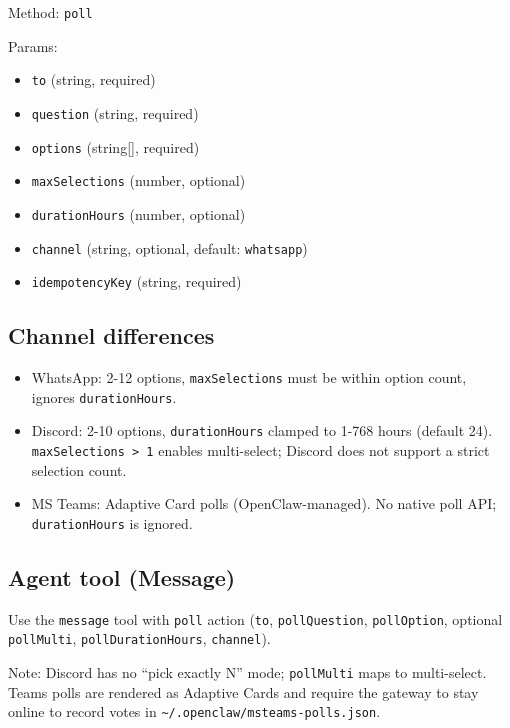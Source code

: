 Method: \texttt{poll}

Params:

\begin{itemize}
  \item \texttt{to} (string, required)
  \item \texttt{question} (string, required)
  \item \texttt{options} (string[], required)
  \item \texttt{maxSelections} (number, optional)
  \item \texttt{durationHours} (number, optional)
  \item \texttt{channel} (string, optional, default: \texttt{whatsapp})
  \item \texttt{idempotencyKey} (string, required)
\end{itemize}


\subsection{Channel differences}


\begin{itemize}
  \item WhatsApp: 2-12 options, \texttt{maxSelections} must be within option count, ignores \texttt{durationHours}.
  \item Discord: 2-10 options, \texttt{durationHours} clamped to 1-768 hours (default 24). \texttt{maxSelections > 1} enables multi-select; Discord does not support a strict selection count.
  \item MS Teams: Adaptive Card polls (OpenClaw-managed). No native poll API; \texttt{durationHours} is ignored.
\end{itemize}


\subsection{Agent tool (Message)}


Use the \texttt{message} tool with \texttt{poll} action (\texttt{to}, \texttt{pollQuestion}, \texttt{pollOption}, optional \texttt{pollMulti}, \texttt{pollDurationHours}, \texttt{channel}).

Note: Discord has no “pick exactly N” mode; \texttt{pollMulti} maps to multi-select.
Teams polls are rendered as Adaptive Cards and require the gateway to stay online
to record votes in \texttt{\textasciitilde{}/.openclaw/msteams-polls.json}.


\clearpage

